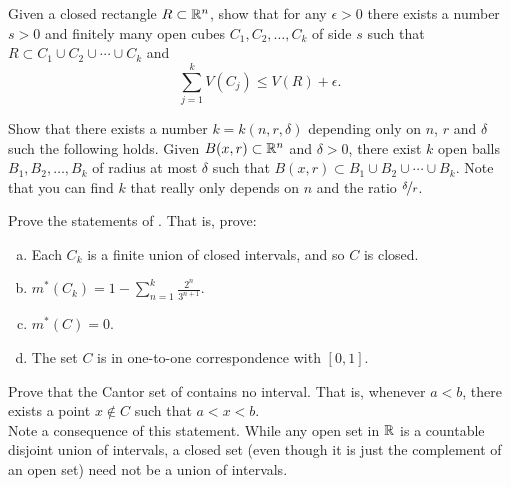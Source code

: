 \begin{exercise}
Given a closed rectangle $R \subset {\mathbb{R}}^n$, show that for any $\epsilon > 0$
there exists a number $s > 0$ and finitely many open cubes $C_1,C_2,\ldots,C_k$
of side $s$ such that
$R \subset C_1 \cup C_2 \cup \cdots \cup C_k$
and
\begin{equation*}
\sum_{j=1}^k V(C_j) \leq V(R) + \epsilon .
\end{equation*}
\end{exercise}

\begin{exercise}
Show that there exists a number $k = k(n,r,\delta)$ depending only on $n$,
$r$ and $\delta$ such
the following holds.
Given $B(x,r) \subset {\mathbb{R}}^n$ and $\delta > 0$, there exist
$k$ open balls $B_1,B_2,\ldots,B_k$ of radius at most
$\delta$ such that $B(x,r) \subset B_1 \cup B_2 \cup \cdots \cup B_k$.
Note that you can find $k$ that really only depends on $n$ and the ratio
$\nicefrac{\delta}{r}$.
\end{exercise}

\begin{exercise}[Challenging]
Prove the statements of .  That is,
prove:
\begin{enumerate}[a)]
\item
Each $C_k$ is a finite union of closed intervals, and so $C$ is closed.
\item
$m^*(C_k) =1 - \sum_{n=1}^k \frac{2^n}{3^{n+1}}$.
\item
$m^*(C) = 0$.
\item
The set $C$ is in one-to-one correspondence with $[0,1]$.
\end{enumerate}
\end{exercise}

\begin{exercise}
Prove that the Cantor set of  contains no
interval.  That is, whenever $a < b$, there exists a point $x \notin C$
such that $a < x < b$.
\\
Note a consequence of this statement.  While any open set in
${\mathbb{R}}$ is a countable disjoint union of intervals, a closed set (even though
it is just the complement of an open set) need not be a union of intervals.
\end{exercise}

